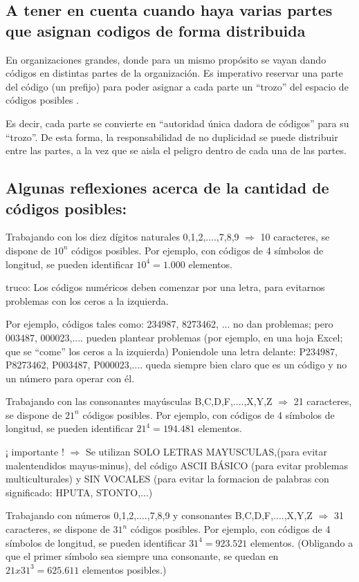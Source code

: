 \documentclass[spanish,12pt,a4paper,final,oneside]{book}
\begin{document}
\subsection{A tener en cuenta cuando haya varias partes que asignan codigos de forma distribuida}
En organizaciones grandes, donde para un mismo propósito se vayan dando códigos en distintas partes de la organización. Es imperativo reservar una parte del código (un prefijo) para poder asignar a cada parte un ``trozo'' del espacio de códigos posibles .

Es decir, cada parte se convierte en ``autoridad única dadora de códigos'' para su ``trozo''. De esta forma, la responsabilidad de no duplicidad se puede distribuir entre las partes, a la vez que se aisla el peligro dentro de cada una de las partes. 


\subsection{Algunas reflexiones acerca de la cantidad de códigos posibles:}
Trabajando con los diez dígitos naturales 0,1,2,....,7,8,9 $\Rightarrow$ 10 caracteres, se dispone de $10^n$ códigos posibles. Por ejemplo, con códigos de 4 símbolos de longitud, se pueden identificar $10^4 = 1.000$  elementos.

truco: Los códigos numéricos deben comenzar por una letra, para evitarnos problemas con los ceros a la izquierda.

Por ejemplo, códigos tales como:  234987, 8273462, ...  no dan problemas; pero 003487, 000023,.... pueden plantear problemas  (por ejemplo, en una hoja Excel; que se ``come'' los ceros a la izquierda) Poniendole una letra delante: P234987, P8273462, P003487, P000023,.... queda siempre bien claro que es un código y no un número para operar con él.

\vspace{1cm}
Trabajando con las consonantes mayúsculas B,C,D,F,....,X,Y,Z $\Rightarrow$ 21 caracteres, se dispone de $21^n$ códigos posibles. Por ejemplo, con códigos de 4 símbolos de longitud, se pueden identificar $21^4 = 194.481$  elementos.

¡ importante ! $\Rightarrow$ Se utilizan SOLO LETRAS MAYUSCULAS,(para evitar malentendidos mayus-minus),  del código ASCII BÁSICO (para evitar problemas multiculturales) y SIN VOCALES (para evitar la formacion de palabras con significado: HPUTA, STONTO,...)

\vspace{1cm}
Trabajando con números 0,1,2,....,7,8,9 y consonantes B,C,D,F,....,X,Y,Z $\Rightarrow$ 31 caracteres, se dispone de $31^n$ códigos posibles. Por ejemplo, con códigos de 4 símbolos de longitud, se pueden identificar $31^4 = 923.521$  elementos. (Obligando a que el primer símbolo sea siempre una consonante, se quedan en $21x31^3 = 625.611$ elementos posibles.)
\end{document}
